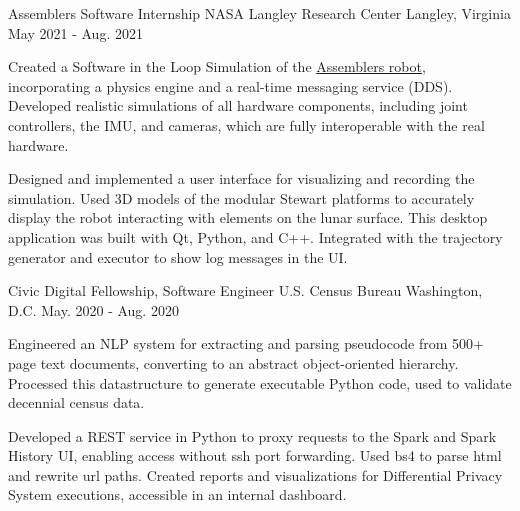 

\begin{cventries}

  \cventry
  {Assemblers Software Internship} %
  {NASA Langley Research Center} %
  {Langley, Virginia} %
  {May 2021 - Aug. 2021} %
  {
    \begin{cvitems} %
      \item {Created a Software in the Loop Simulation of the \href{https://youtu.be/_9Bncie6AmM}{Assemblers robot}, incorporating a physics engine and a real-time messaging service (DDS). Developed realistic simulations of all hardware components, including joint controllers, the IMU, and cameras, which are fully interoperable with the real hardware.}
      \item {Designed and implemented a user interface for visualizing and recording the simulation. Used 3D models of the modular Stewart platforms to accurately display the robot interacting with elements on the lunar surface. This desktop application was built with Qt, Python, and C++. Integrated with the trajectory generator and executor to show log messages in the UI.}
    \end{cvitems}
  }

  \cventry
  {Civic Digital Fellowship, Software Engineer} %
  {U.S. Census Bureau} %
  {Washington, D.C.} %
  {May. 2020 - Aug. 2020} %
  {
    \begin{cvitems} %
      \item {Engineered an NLP system for extracting and parsing pseudocode from 500+ page text documents, converting to an abstract object-oriented hierarchy. Processed this datastructure to generate executable Python code, used to validate decennial census data.}
      \item {Developed a REST service in Python to proxy requests to the Spark and Spark History UI, enabling access without ssh port forwarding. Used bs4 to parse html and rewrite url paths. Created reports and visualizations for Differential Privacy System executions, accessible in an internal dashboard.}
    \end{cvitems}
  }


\end{cventries}
